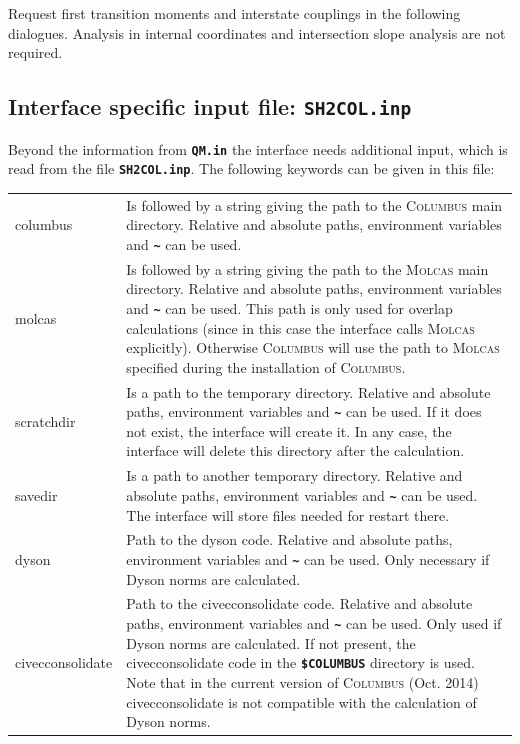 \documentclass[a4paper,11pt,DIV=15,openany,twoside=false]{scrbook}
\newcommand{\ttt}[1]{\textbf{\texttt{#1}}}
\begin{document}
Request first transition moments and interstate couplings in the following dialogues. Analysis in internal coordinates and intersection slope analysis are not required.

\subsection{Interface specific input file: \ttt{SH2COL.inp}}

Beyond the information from \ttt{QM.in} the interface needs additional input, which is read from the file \ttt{SH2COL.inp}. The following keywords can be given in this file:

\begin{tabular}{lp{9cm}}
columbus        &Is followed by a string giving the path to the \textsc{Columbus} main directory. Relative and absolute paths, environment variables and \ttt{\textasciitilde} can be used.\\
molcas          &Is followed by a string giving the path to the \textsc{Molcas} main directory.  Relative and absolute paths, environment variables and \ttt{\textasciitilde} can be used. This path is only used for overlap calculations (since in this case the interface calls \textsc{Molcas} explicitly). Otherwise \textsc{Columbus} will use the path to \textsc{Molcas} specified during the installation of \textsc{Columbus}.\\
scratchdir      &Is a path to the temporary directory. Relative and absolute paths, environment variables and \ttt{\textasciitilde} can be used. If it does not exist, the interface will create it. In any case, the interface will delete this directory after the calculation.\\
savedir         &Is a path to another temporary directory.  Relative and absolute paths, environment variables and \ttt{\textasciitilde} can be used. The interface will store files needed for restart there.\\
dyson           &Path to the dyson code. Relative and absolute paths, environment variables and \ttt{\textasciitilde} can be used. Only necessary if Dyson norms are calculated.\\
civecconsolidate&Path to the civecconsolidate code. Relative and absolute paths, environment variables and \ttt{\textasciitilde} can be used. Only used if Dyson norms are calculated. If not present, the civecconsolidate code in the \ttt{\$COLUMBUS} directory is used. Note that in the current version of \textsc{Columbus} (Oct. 2014) civecconsolidate is not compatible with the calculation of Dyson norms.\\

\end{tabular}
\end{document}

